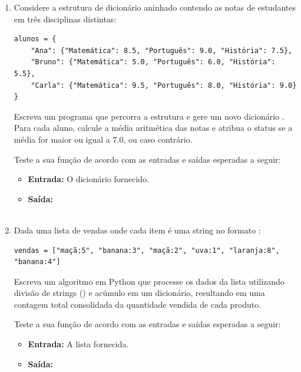 \begin{enumerate}[label=\textbf{Q\arabic*.}]
\item Considere a estrutura de dicionário aninhado contendo as notas de estudantes em três disciplinas distintas:

\begin{verbatim}
alunos = {
    "Ana": {"Matemática": 8.5, "Português": 9.0, "História": 7.5},
    "Bruno": {"Matemática": 5.0, "Português": 6.0, "História": 5.5},
    "Carla": {"Matemática": 9.5, "Português": 8.0, "História": 9.0}
}
\end{verbatim}

Escreva um programa que percorra a estrutura e gere um novo dicionário . Para cada aluno, calcule a média aritmética das notas e atribua o status  se a média for maior ou igual a 7.0, ou  caso contrário.

Teste a sua função de acordo com as entradas e saídas esperadas a seguir:

\begin{itemize}
    \item \textbf{Entrada:} O dicionário  fornecido.
    \item \textbf{Saída:} \\\\
\end{itemize}




\item Dada uma lista de vendas onde cada item é uma string no formato :
\begin{verbatim}
vendas = ["maçã:5", "banana:3", "maçã:2", "uva:1", "laranja:8", "banana:4"]
\end{verbatim}
Escreva um algoritmo em Python que processe os dados da lista utilizando divisão de strings () e acúmulo em um dicionário, resultando em uma contagem total consolidada da quantidade vendida de cada produto.

Teste a sua função de acordo com as entradas e saídas esperadas a seguir:

\begin{itemize}
    \item \textbf{Entrada:} A lista  fornecida.
    \item \textbf{Saída:} 
\end{itemize}


\end{enumerate}
